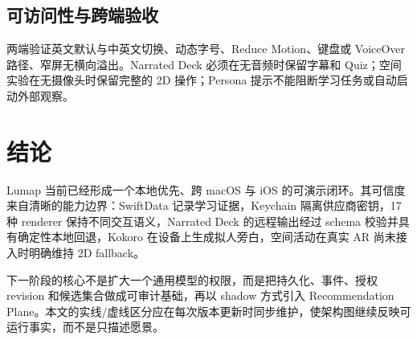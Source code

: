 \documentclass[11pt,a4paper,fontset=none]{ctexart}
\begin{document}
\subsection{可访问性与跨端验收}
两端验证英文默认与中英文切换、动态字号、Reduce Motion、键盘或 VoiceOver 路径、窄屏无横向溢出。Narrated Deck 必须在无音频时保留字幕和 Quiz；空间实验在无摄像头时保留完整的 2D 操作；Persona 提示不能阻断学习任务或自动启动外部观察。

\section{结论}
Lumap 当前已经形成一个本地优先、跨 macOS 与 iOS 的可演示闭环。其可信度来自清晰的能力边界：SwiftData 记录学习证据，Keychain 隔离供应商密钥，17 种 renderer 保持不同交互语义，Narrated Deck 的远程输出经过 schema 校验并具有确定性本地回退，Kokoro 在设备上生成拟人旁白，空间活动在真实 AR 尚未接入时明确维持 2D fallback。

下一阶段的核心不是扩大一个通用模型的权限，而是把持久化、事件、授权 revision 和候选集合做成可审计基础，再以 shadow 方式引入 Recommendation Plane。本文的实线/虚线区分应在每次版本更新时同步维护，使架构图继续反映可运行事实，而不是只描述愿景。

\appendix
\end{document}
